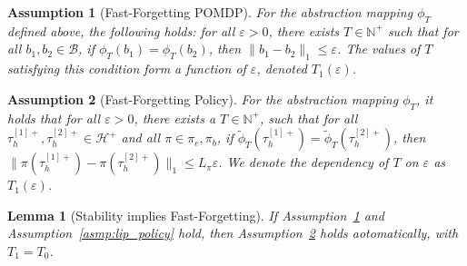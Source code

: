 \documentclass[twoside]{article}
\newtheorem{lemma}{Lemma}
\newtheorem{assumption}{Assumption}
\newtheorem{remark}{Remark}
\newcommand{\N}{\mathbb{N}}
\newcommand{\CAL}[1]{\mathcal{#1}}
\begin{document}
\begin{assumption}[Fast-Forgetting POMDP]\label{asmp:fast_forgetting_POMDP}
For the abstraction mapping $\phi_T$ defined above, the following holds: for all $\varepsilon > 0$, there exists $T \in \N^+$ such that for all $b_1, b_2 \in \CAL{B}$, if $\phi_T(b_1) = \phi_T(b_2)$, then $\|b_1 - b_2\|_1 \leq \varepsilon$. The values of $T$ satisfying this condition form a function of $\varepsilon$, denoted $T_1(\varepsilon)$.
\end{assumption}

\begin{assumption}[Fast-Forgetting Policy]\label{asmp:fast_forgetting_policy}
    For the abstraction mapping $\phi_T$, it holds that for all $\varepsilon > 0$, there exists a $T \in \N^+$, such that for all $\tau_h^{[1]+}, \tau_h^{[2]+} \in \CAL{H}^+$ and all $\pi \in {\pi_e, \pi_b}$, if $\tilde{\phi}_T(\tau_h^{[1]+}) = \tilde{\phi}_T(\tau_h^{[2]+})$, then $\|\pi(\tau_h^{[1]+}) - \pi(\tau_h^{[2]+})\|_1 \leq L_\pi \varepsilon$. We denote the dependency of $T$ on $\varepsilon$ as $T_1(\varepsilon)$.
\end{assumption}
\begin{lemma}[Stability implies Fast-Forgetting]\label{lem:weaker}
If Assumption~\ref{asmp:fast_forgetting_POMDP} and Assumption~\ref{asmp:lip_policy} hold, then Assumption~\ref{asmp:fast_forgetting_policy} holds aotomatically, with $T_1=T_0$.
\end{lemma}


\end{document}
